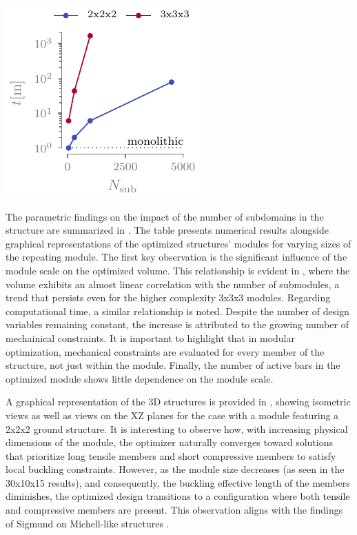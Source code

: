 \begin{marginfigure}
    \centering
    \includegraphics{figures/05_cellular_opt/00_module_scale_tab/scale_tab_t.pdf}
    \caption{}
    \label{fig:05_scale_t}
\end{marginfigure}

The parametric findings on the impact of the number of subdomains in the structure are summarized in . The table presents numerical results alongside graphical representations of the optimized structures' modules for varying sizes of the repeating module. The first key observation is the significant influence of the module scale on the optimized volume. This relationship is evident in , where the volume exhibits an almost linear correlation with the number of submodules, a trend that persists even for the higher complexity 3x3x3 modules. Regarding computational time, a similar relationship is noted. Despite the number of design variables remaining constant, the increase is attributed to the growing number of mechainical constraints. It is important to highlight that in modular optimization, mechanical constraints are evaluated for every member of the structure, not just within the module. Finally, the number of active bars in the optimized module shows little dependence on the module scale.

A graphical representation of the 3D structures is provided in , showing isometric views as well as views on the XZ planes for the case with a module featuring a 2x2x2 ground structure. It is interesting to observe how, with increasing physical dimensions of the module, the optimizer naturally converges toward solutions that prioritize long tensile members and short compressive members to satisfy local buckling constraints. However, as the module size decreases (as seen in the 30x10x15 results), and consequently, the buckling effective length of the members diminishes, the optimized design transitions to a configuration where both tensile and compressive members are present. This observation aligns with the findings of Sigmund on Michell-like structures .

